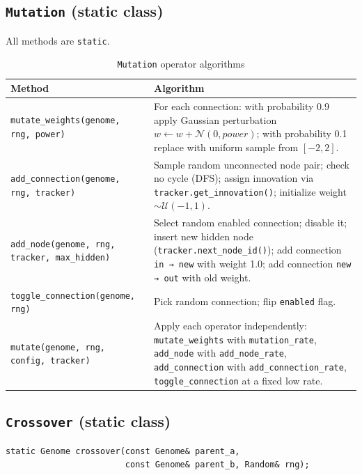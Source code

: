 \subsection{\texttt{Mutation} (static class)}

All methods are \texttt{static}.

\begin{table}[H]
\centering\small
\caption{\texttt{Mutation} operator algorithms}
\begin{tabularx}{\textwidth}{@{}lX@{}}
\toprule
\textbf{Method} & \textbf{Algorithm} \\
\midrule
\texttt{mutate\_weights(genome, rng, power)} &
  For each connection: with probability 0.9 apply Gaussian perturbation
  $w \leftarrow w + \mathcal{N}(0, \mathit{power})$; with probability 0.1 replace
  with uniform sample from $[-2, 2]$. \\
\texttt{add\_connection(genome, rng, tracker)} &
  Sample random unconnected node pair; check no cycle (DFS); assign innovation via
  \texttt{tracker.get\_innovation()}; initialize weight $\sim \mathcal{U}(-1,1)$. \\
\texttt{add\_node(genome, rng, tracker, max\_hidden)} &
  Select random enabled connection; disable it; insert new hidden node
  (\texttt{tracker.next\_node\_id()}); add connection \texttt{in → new} with weight 1.0;
  add connection \texttt{new → out} with old weight. \\
\texttt{toggle\_connection(genome, rng)} &
  Pick random connection; flip \texttt{enabled} flag. \\
\texttt{mutate(genome, rng, config, tracker)} &
  Apply each operator independently: \texttt{mutate\_weights} with
  \texttt{mutation\_rate}, \texttt{add\_node} with \texttt{add\_node\_rate},
  \texttt{add\_connection} with \texttt{add\_connection\_rate},
  \texttt{toggle\_connection} at a fixed low rate. \\
\bottomrule
\end{tabularx}
\end{table}

\subsection{\texttt{Crossover} (static class)}

\begin{lstlisting}
static Genome crossover(const Genome& parent_a,
                        const Genome& parent_b, Random& rng);
\end{lstlisting}

